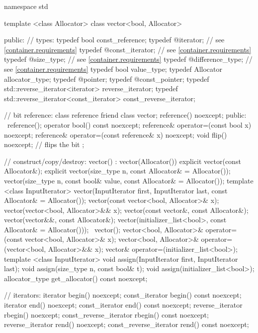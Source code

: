 \begin{codeblock}
namespace std {
  template <class Allocator>
  class vector<bool, Allocator> {
  public:
    // types:
    typedef bool                                  const_reference;
    typedef @\impdefnc@                iterator;        // see \ref{container.requirements}
    typedef @\impdefnc@                const_iterator;  // see \ref{container.requirements}
    typedef @\impdefnc@                size_type;       // see \ref{container.requirements}
    typedef @\impdefnc@                difference_type; // see \ref{container.requirements}
    typedef bool                                  value_type;
    typedef Allocator                             allocator_type;
    typedef @\impdefnc@                pointer;
    typedef @\impdefnc@                const_pointer;
    typedef std::reverse_iterator<iterator>       reverse_iterator;
    typedef std::reverse_iterator<const_iterator> const_reverse_iterator;

    // bit reference:
    class reference {
      friend class vector;
      reference() noexcept;
    public:
      ~reference();
      operator bool() const noexcept;
      reference& operator=(const bool x) noexcept;
      reference& operator=(const reference& x) noexcept;
      void flip() noexcept;     // flips the bit
    };

    // construct/copy/destroy:
    vector() : vector(Allocator()) { }
    explicit vector(const Allocator&);
    explicit vector(size_type n, const Allocator& = Allocator());
    vector(size_type n, const bool& value,
           const Allocator& = Allocator());
    template <class InputIterator>
      vector(InputIterator first, InputIterator last,
             const Allocator& = Allocator());
    vector(const vector<bool, Allocator>& x);
    vector(vector<bool, Allocator>&& x);
    vector(const vector&, const Allocator&);
    vector(vector&&, const Allocator&);
    vector(initializer_list<bool>, const Allocator& = Allocator()));
   ~vector();
    vector<bool, Allocator>& operator=(const vector<bool, Allocator>& x);
    vector<bool, Allocator>& operator=(vector<bool, Allocator>&& x);
    vector& operator=(initializer_list<bool>);
    template <class InputIterator>
      void assign(InputIterator first, InputIterator last);
    void assign(size_type n, const bool& t);
    void assign(initializer_list<bool>);
    allocator_type get_allocator() const noexcept;

    // iterators:
    iterator               begin() noexcept;
    const_iterator         begin() const noexcept;
    iterator               end() noexcept;
    const_iterator         end() const noexcept;
    reverse_iterator       rbegin() noexcept;
    const_reverse_iterator rbegin() const noexcept;
    reverse_iterator       rend() noexcept;
    const_reverse_iterator rend() const noexcept;

}}
\end{codeblock}
